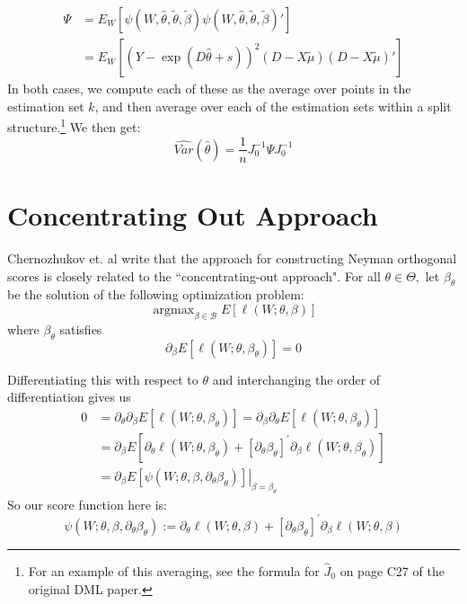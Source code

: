 \documentclass[11pt]{article}
\DeclareMathOperator*{\argmax}{argmax}
\begin{document}
\begin{enumerate}
	\begin{align*}
		\Psi &= E_W\left[\psi(W, \hat{\theta},\tilde{\theta}, \tilde{\beta})\psi(W, \hat{\theta},\tilde{\theta}, \tilde{\beta})'\right] \\
			&= E_W\left[(Y - \exp(D\hat{\theta} + s))^2(D - X\tilde{\mu})(D - X\tilde{\mu})'\right]
	\end{align*}
	In both cases, we compute each of these as the average over points in the estimation set $k$, and then average over each of the estimation sets within a split structure.\footnote{For an example of this averaging, see the formula for $\hat{J}_0$ on page C27 of the original DML paper.} We then get:
	$$\hat{Var}(\hat{\theta}) = \frac{1}{n} J_0^{-1} \Psi J_0^{-1}$$

\end{enumerate}


\section{Concentrating Out Approach}
Chernozhukov et. al write that the approach for constructing Neyman orthogonal scores is closely related to the ``concentrating-out approach". For all $\theta \in \Theta,$ let $\beta_{\theta}$ be the solution of the following optimization problem:
$$
\argmax_{\beta \in \mathcal{B}} E[\ell(W ; \theta, \beta)]
$$
where $\beta_\theta$ satisfies
$$\partial_{\beta} E\left[\ell\left(W ; \theta, \beta_{\theta}\right)\right]=0$$

Differentiating this with respect to $\theta$ and interchanging the order of differentiation gives us
$$\begin{aligned}
0 &=\partial_{\theta} \partial_{\beta} E\left[\ell\left(W ; \theta, \beta_{\theta}\right)\right]=\partial_{\beta} \partial_{\theta} E\left[\ell\left(W ; \theta, \beta_{\theta}\right)\right] \\
&=\partial_{\beta} E\left[\partial_{\theta} \ell\left(W ; \theta, \beta_{\theta}\right)+\left[\partial_{\theta} \beta_{\theta}\right]^{\prime} \partial_{\beta} \ell\left(W ; \theta, \beta_{\theta}\right)\right] \\
&=\left.\partial_{\beta} E\left[\psi\left(W ; \theta, \beta, \partial_{\theta} \beta_{\theta}\right)\right]\right|_{\beta=\beta_{\theta}}
\end{aligned}$$
So our score function here is:
$$\psi\left(W ; \theta, \beta, \partial_{\theta} \beta_{\theta}\right):=\partial_{\theta} \ell(W ; \theta, \beta)+\left[\partial_{\theta} \beta_{\theta}\right]^{\prime} \partial_{\beta} \ell(W ; \theta, \beta)$$
\end{document}
